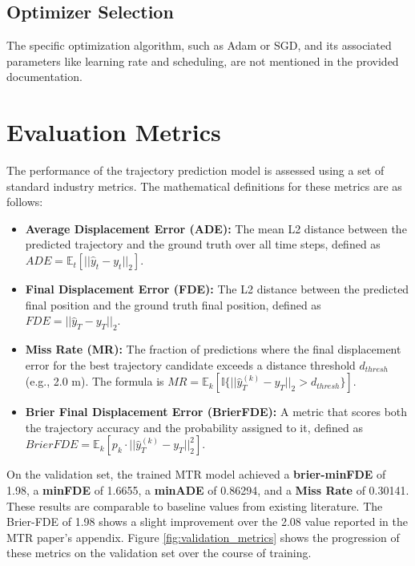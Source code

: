 \subsection{Optimizer Selection}
The specific optimization algorithm, such as Adam or SGD, and its associated parameters like learning rate and scheduling, are not mentioned in the provided documentation.
 
\section{Evaluation Metrics}
\label{sec:exp_metrics}
The performance of the trajectory prediction model is assessed using a set of standard industry metrics. The mathematical definitions for these metrics are as follows:
\begin{itemize}
 \item \textbf{Average Displacement Error (ADE):} The mean L2 distance between the predicted trajectory and the ground truth over all time steps, defined as $ADE=\mathbb{E}_{t}[||\hat{y}_{t}-y_{t}||_{2}]$.
 \item \textbf{Final Displacement Error (FDE):} The L2 distance between the predicted final position and the ground truth final position, defined as $FDE=||\hat{y}_{T}-y_{T}||_{2}$.
 \item \textbf{Miss Rate (MR):} The fraction of predictions where the final displacement error for the best trajectory candidate exceeds a distance threshold $d_{thresh}$ (e.g., 2.0 m). The formula is $MR=\mathbb{E}_{k}[\mathbb{I}\{||\hat{y}_{T}^{(k)}-y_{T}||_{2}>d_{thresh}\}]$.
 \item \textbf{Brier Final Displacement Error (BrierFDE):} A metric that scores both the trajectory accuracy and the probability assigned to it, defined as $BrierFDE=\mathbb{E}_{k}[p_{k}\cdot||\hat{y}_{T}^{(k)}-y_{T}||_{2}^{2}]$.
\end{itemize}
On the validation set, the trained MTR model achieved a \textbf{brier-minFDE} of 1.98, a \textbf{minFDE} of 1.6655, a \textbf{minADE} of 0.86294, and a \textbf{Miss Rate} of 0.30141. These results are comparable to baseline values from existing literature. The Brier-FDE of 1.98 shows a slight improvement over the 2.08 value reported in the MTR paper's appendix. Figure \ref{fig:validation_metrics} shows the progression of these metrics on the validation set over the course of training.

